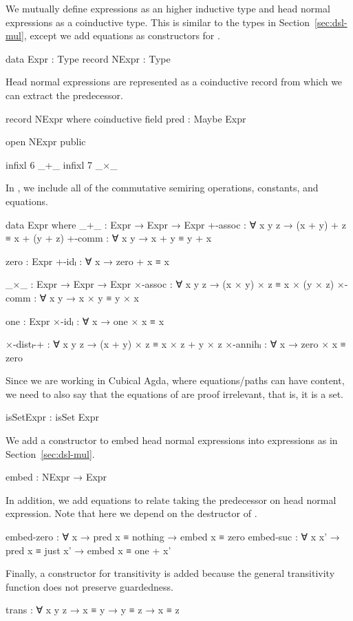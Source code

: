 We mutually define expressions as an higher inductive type and head normal
expressions as a coinductive type. This is similar to the types in
Section~\ref{sec:dsl-mul}, except we add equations as constructors for
.
\begin{AgdaAlign}
\begin{code}
  data Expr : Type
  record NExpr : Type
\end{code}
Head normal expressions are represented as a coinductive record from which we
can extract the predecessor.
\begin{code}
  record NExpr where
    coinductive
    field pred : Maybe Expr
\end{code}
\begin{code}[hide]
  open NExpr public

  infixl 6 _+_
  infixl 7 _×_
\end{code}
In , we include all of the commutative semiring operations,
constants, and equations.
\begin{code}
  data Expr where
    _+_        : Expr → Expr → Expr
    +-assoc    : ∀ x y z → (x + y) + z ≡ x + (y + z)
    +-comm     : ∀ x y → x + y ≡ y + x

    zero       : Expr
    +-idₗ      : ∀ x → zero + x ≡ x

    _×_        : Expr → Expr → Expr
    ×-assoc    : ∀ x y z → (x × y) × z ≡ x × (y × z)
    ×-comm     : ∀ x y → x × y ≡ y × x

    one        : Expr
    ×-idₗ      : ∀ x → one × x ≡ x

    ×-distₗ-+  : ∀ x y z → (x + y) × z ≡ x × z + y × z
    ×-annihₗ   : ∀ x → zero × x ≡ zero
\end{code}
Since we are working in Cubical Agda, where equations/paths can have content, we
need to also say that the equations of  are proof irrelevant,
that is, it is a set.
\begin{code}
    isSetExpr  : isSet Expr
\end{code}
We add a constructor to embed head normal expressions into expressions as in
Section~\ref{sec:dsl-mul}.
\begin{code}
    embed : NExpr → Expr
\end{code}
In addition, we add equations to relate taking the predecessor on head normal
expression. Note that here we depend on the destructor  of
.
\begin{code}
    embed-zero  :
      ∀ x → pred x ≡ nothing → embed x ≡ zero
    embed-suc   :
      ∀ x x' → pred x ≡ just x' → embed x ≡ one + x'
\end{code}
Finally, a constructor for transitivity is added because the general
transitivity function does not preserve guardedness.
\begin{code}
    trans : ∀ {x y z} → x ≡ y → y ≡ z → x ≡ z
\end{code}
\end{AgdaAlign}

